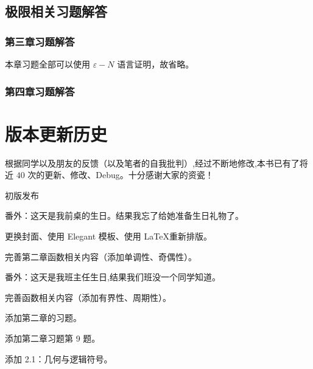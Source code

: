 \documentclass[lang=cn,10pt,twoside]{elegantbook}
\begin{document}
\section{极限相关习题解答}
\subsection{第三章习题解答}
本章习题全部可以使用 $\varepsilon-N$ 语言证明，故省略。
\subsection{第四章习题解答}


\appendix

\chapter{版本更新历史}

根据同学以及朋友的反馈（以及笔者的自我批判）,经过不断地修改,本书已有了将近 $40$ 次的更新、修改、Debug。十分感谢大家的资瓷！

\begin{change}
  \item 初版发布
\end{change}
番外：这天是我前桌的生日。结果我忘了给她准备生日礼物了。

\begin{change}
  \item 更换封面、使用 Elegant 模板、使用 \LaTeX 重新排版。
  \item 完善第二章函数相关内容（添加单调性、奇偶性）。
\end{change}
番外：这天是我班主任生日,结果我们班没一个同学知道。

\begin{change}
  \item 完善函数相关内容（添加有界性、周期性）。
\end{change}

\begin{change}
  \item 添加第二章的习题。
\end{change}

\begin{change}
  \item 添加第二章习题第 9 题。
  \item 添加 2.1：几何与逻辑符号。
\end{change}
\end{document}
